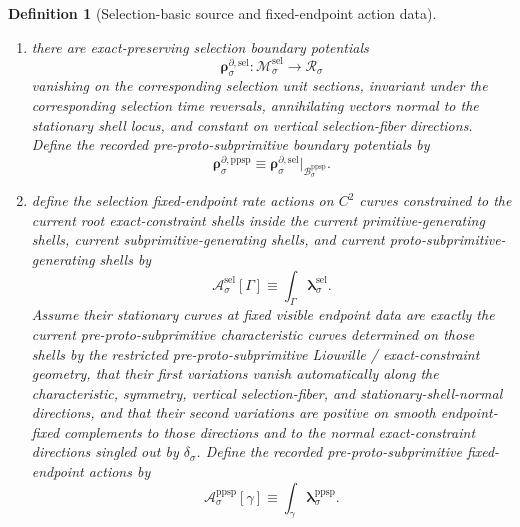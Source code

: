 \documentclass[11pt]{article}
\newcommand{\PhaseReadClass}[1]{\mathscr R_{#1}}
\newcommand{\ConstraintGap}[1]{\delta_{#1}}
\newcommand{\PreProtoSubprimSpace}[1]{\mathcal B_{#1}^{\mathrm{ppsp}}}
\newcommand{\PreProtoSubprimRateForm}[1]{\boldsymbol{\lambda}_{#1}^{\mathrm{ppsp}}}
\newcommand{\PreProtoSubprimDensitySource}[1]{\boldsymbol{q}_{#1}^{\mathrm{ppsp}}}
\newcommand{\PreProtoSubprimFluxSource}[1]{\boldsymbol{j}_{#1}^{\mathrm{ppsp}}}
\newcommand{\PreProtoSubprimBoundarySource}[1]{\boldsymbol{\rho}_{#1}^{\partial,\mathrm{ppsp}}}
\newcommand{\PreProtoSubprimAction}[1]{\mathscr A_{#1}^{\mathrm{ppsp}}}
\newcommand{\SelSpace}[1]{\mathcal M_{#1}^{\mathrm{sel}}}
\newcommand{\SelRateForm}[1]{\boldsymbol{\lambda}_{#1}^{\mathrm{sel}}}
\newcommand{\SelDensitySource}[1]{\boldsymbol{q}_{#1}^{\mathrm{sel}}}
\newcommand{\SelFluxSource}[1]{\boldsymbol{j}_{#1}^{\mathrm{sel}}}
\newcommand{\SelBoundarySource}[1]{\boldsymbol{\rho}_{#1}^{\partial,\mathrm{sel}}}
\newcommand{\SelAction}[1]{\mathscr A_{#1}^{\mathrm{sel}}}
\newtheorem{definition}{Definition}
\begin{document}
\begin{definition}[Selection-basic source and fixed-endpoint action data]
\begin{enumerate}
    \begin{equation}
    \PreProtoSubprimDensitySource{\sigma}\equiv \SelDensitySource{\sigma}|_{\PreProtoSubprimSpace{\sigma}},
    \qquad
    \PreProtoSubprimFluxSource{\sigma}\equiv \SelFluxSource{\sigma}|_{\PreProtoSubprimSpace{\sigma}}.
    \label{eq:preproto_sources_from_selection}
    \end{equation}
    \item there are exact-preserving selection boundary potentials
    \[
    \SelBoundarySource{\sigma}:\SelSpace{\sigma}\to\PhaseReadClass{\sigma}
    \]
    vanishing on the corresponding selection unit sections, invariant under the corresponding selection time reversals, annihilating vectors normal to the stationary shell locus, and constant on vertical selection-fiber directions. Define the recorded pre-proto-subprimitive boundary potentials by
    \begin{equation}
    \PreProtoSubprimBoundarySource{\sigma}\equiv \SelBoundarySource{\sigma}|_{\PreProtoSubprimSpace{\sigma}}.
    \label{eq:preproto_boundary_from_selection}
    \end{equation}
    \item define the selection fixed-endpoint rate actions on \(C^2\) curves constrained to the current root exact-constraint shells inside the current primitive-generating shells, current subprimitive-generating shells, and current proto-subprimitive-generating shells by
    \begin{equation}
    \SelAction{\sigma}[\Gamma]\equiv \int_\Gamma \SelRateForm{\sigma}.
    \label{eq:selection_action}
    \end{equation}
    Assume their stationary curves at fixed visible endpoint data are exactly the current pre-proto-subprimitive characteristic curves determined on those shells by the restricted pre-proto-subprimitive Liouville / exact-constraint geometry, that their first variations vanish automatically along the characteristic, symmetry, vertical selection-fiber, and stationary-shell-normal directions, and that their second variations are positive on smooth endpoint-fixed complements to those directions and to the normal exact-constraint directions singled out by \(\ConstraintGap{\sigma}\). Define the recorded pre-proto-subprimitive fixed-endpoint actions by
    \begin{equation}
    \PreProtoSubprimAction{\sigma}[\gamma]\equiv \int_\gamma \PreProtoSubprimRateForm{\sigma}.
    \label{eq:preproto_action_from_selection}
    \end{equation}
\end{enumerate}
\end{definition}
\end{document}
